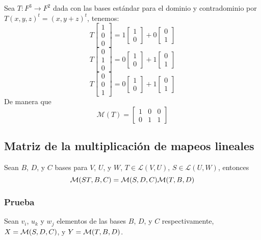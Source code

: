 \documentclass{article}
\begin{document}
Sea $T:F^3\rightarrow F^2$ dada con las bases estándar para el dominio y
contradominio por $T(x,y,z)^t = (x,y + z)^t$, tenemos:
{
$$T\begin{bmatrix}
    1\\
    0\\
    0    
\end{bmatrix}
 = 
 1\begin{bmatrix}
    1\\
    0
 \end{bmatrix}
 +0\begin{bmatrix}
    0\\
    1
 \end{bmatrix}
 $$
 $$T\begin{bmatrix}
    0\\
    1\\
    0
 \end{bmatrix}
 =
 0\begin{bmatrix}
    1\\
    0
 \end{bmatrix}
 +1\begin{bmatrix}
    0\\
    1
 \end{bmatrix}
 $$
 $$
 T\begin{bmatrix}
    0\\
    0\\
    1
 \end{bmatrix}
 =
 0\begin{bmatrix}
    1\\
    0
 \end{bmatrix}
 +
 1\begin{bmatrix}
    0\\
    1
 \end{bmatrix}
 $$
}
De manera que
$$\mathcal{M}(T) = \begin{bmatrix}
    1 & 0 & 0\\
    0 & 1 & 1
\end{bmatrix}$$
\newpage

\subsection{Matriz de la multiplicación de mapeos lineales}
Sean $B$, $D$, y $C$ bases para $V$, $U$, y $W$, $T\in\mathcal{L}(V,U)$,
$S\in\mathcal{L}(U,W)$, entonces
$$\mathcal{M}(ST,B,C) = \mathcal{M}(S,D,C)\mathcal{M}(T,B,D)$$
\subsubsection*{Prueba}
Sean $v_i$, $u_k$ y $w_j$ elementos de las bases $B$, $D$, y $C$ respectivamente, $X=\mathcal{M}(S,D,C)$, y $Y=\mathcal{M}(T,B,D)$.
\end{document}
